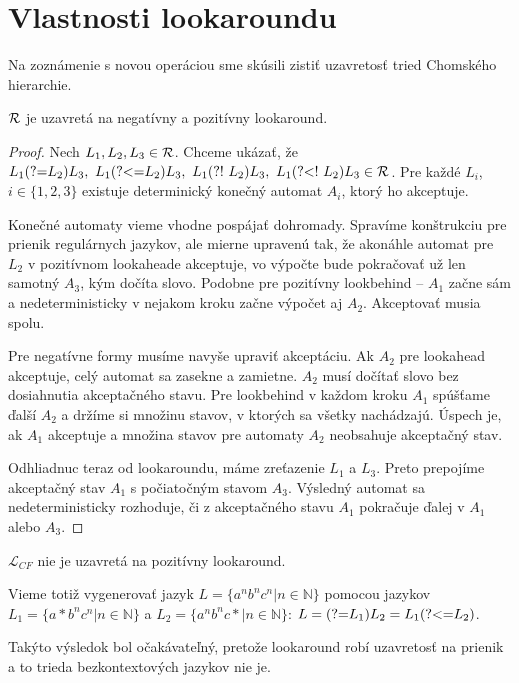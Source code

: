 \documentclass{svk_long_sk}
\def\R{{\cal R}} %
\def\L{\mathscr{L}} %
\def\N{\mathds{N}} %
\def\lookahead{\text{(?=}}
\def\nlookahead{\text{(?!~}}
\def\lookbehind{\text{(?\textless =}}
\def\nlookbehind{\text{(?\textless !~}}
\begin{document}
\section{Vlastnosti lookaroundu}
Na zoznámenie s novou operáciou sme skúsili zistiť uzavretosť tried Chomského hierarchie.
\begin{theorem}
$\R$ je uzavretá na negatívny a pozitívny lookaround.
\end{theorem}
\begin{proof}
Nech $L_1,L_2,L_3\in\R$. Chceme ukázať, že $L_1\lookahead L_2)L_3,~ L_1\lookbehind L_2)L_3,~ L_1\nlookahead L_2)L_3,~ L_1\nlookbehind L_2)L_3 \in \R$. Pre každé $L_i$, $i \in \lbrace 1,2,3\rbrace$ existuje determinický konečný automat $A_i$, ktorý ho akceptuje.

Konečné automaty vieme vhodne pospájať dohromady. Spravíme konštrukciu pre prienik regulárnych jazykov, ale mierne upravenú tak, že akonáhle automat pre $L_2$ v pozitívnom lookaheade akceptuje, vo výpočte bude pokračovať už len samotný $A_3$, kým dočíta slovo. Podobne pre pozitívny lookbehind -- $A_1$ začne sám a nedeterministicky v nejakom kroku začne výpočet aj $A_2$. Akceptovať musia spolu.

Pre negatívne formy musíme navyše upraviť akceptáciu. Ak $A_2$ pre lookahead akceptuje, celý automat sa zasekne a zamietne. $A_2$ musí dočítať slovo bez dosiahnutia akceptačného stavu. Pre lookbehind v každom kroku $A_1$ spúšťame ďalší $A_2$ a držíme si množinu stavov, v ktorých sa všetky nachádzajú. Úspech je, ak $A_1$ akceptuje a množina stavov pre automaty $A_2$ neobsahuje akceptačný stav.

Odhliadnuc teraz od lookaroundu, máme zreťazenie $L_1$ a $L_3$. Preto prepojíme akceptačný stav $A_1$ s počiatočným stavom $A_3$. Výsledný automat sa nedeterministicky rozhoduje, či z akceptačného stavu $A_1$ pokračuje ďalej v $A_1$ alebo $A_3$.
\end{proof}

\begin{theorem}
$\L_{CF}$ nie je uzavretá na pozitívny lookaround.
\end{theorem}
Vieme totiž vygenerovať jazyk $L=\lbrace a^nb^nc^n|n\in\N\rbrace$ pomocou jazykov $L_1=\lbrace a*b^nc^n|n\in\N\rbrace$ a $L_2=\lbrace a^nb^nc*|n\in\N\rbrace$: $L=\lookahead L_1)L_2 =L_1\lookbehind L_2)$.

Takýto výsledok bol očakávateľný, pretože lookaround robí uzavretosť na prienik a to trieda bezkontextových jazykov nie je.
\end{document}
